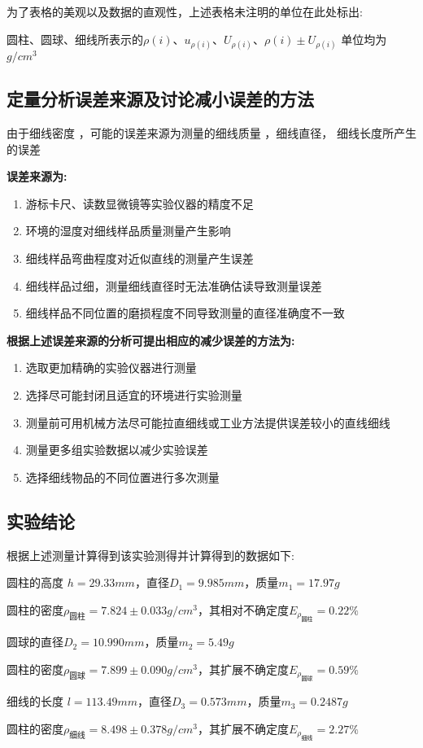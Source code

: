 \documentclass[UTF8]{ctexart}
\begin{document}
\begin{spacing}{1.2}
    为了表格的美观以及数据的直观性，上述表格未注明的单位在此处标出:
    
圆柱、圆球、细线所表示的$\rho(i) $、$u_{\rho(i)}$、$U_{\rho(i)}$、$\rho(i) \pm U_{\rho(i)}$ 单位均为 $g/cm^3$
\end{spacing}

\subsection{定量分析误差来源及讨论减小误差的方法}
由于细线密度 ，可能的误差来源为测量的细线质量 ，细线直径， 细线长度所产生的误差

\textbf{误差来源为:}
\begin{enumerate}
    \item 游标卡尺、读数显微镜等实验仪器的精度不足
    \item 环境的湿度对细线样品质量测量产生影响
    \item 细线样品弯曲程度对近似直线的测量产生误差
    \item 细线样品过细，测量细线直径时无法准确估读导致测量误差
    \item 细线样品不同位置的磨损程度不同导致测量的直径准确度不一致
\end{enumerate}

\textbf{根据上述误差来源的分析可提出相应的减少误差的方法为:}
\begin{enumerate}
    \item 选取更加精确的实验仪器进行测量
    \item 选择尽可能封闭且适宜的环境进行实验测量
    \item 测量前可用机械方法尽可能拉直细线或工业方法提供误差较小的直线细线
    \item 测量更多组实验数据以减少实验误差
    \item 选择细线物品的不同位置进行多次测量
\end{enumerate}

\subsection{实验结论}
\begin{spacing}{1.4}
根据上述测量计算得到该实验测得并计算得到的数据如下:

圆柱的高度 $h=29.33mm$，直径$D_1=9.985mm$，质量$m_1=17.97g$

圆柱的密度$\rho_{\text{圆柱}}=7.824 \pm 0.033 g/cm^3$，其相对不确定度$E_{\rho_{\text{圆柱}}}=0.22\%$

圆球的直径$D_2=10.990mm$，质量$m_2=5.49g$

圆柱的密度$\rho_{\text{圆球}}=7.899 \pm 0.090 g/cm^3$，其扩展不确定度$E_{\rho_{\text{圆球}}}=0.59\%$

细线的长度 $l=113.49mm$，直径$D_3=0.573mm$，质量$m_3=0.2487g$

圆柱的密度$\rho_{\text{细线}}= 8.498 \pm 0.378 g/cm^3$，其扩展不确定度$E_{\rho_{\text{细线}}}=2.27\%$
\end{spacing}
\end{document}
